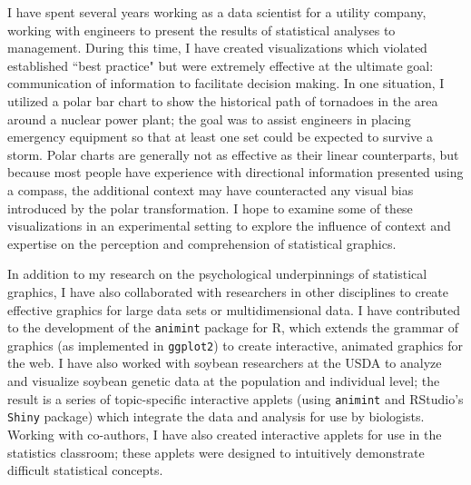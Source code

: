 \documentclass[12pt, letterpaper, sans]{moderncv}
\begin{document}

\vspace{.5cm}\hspace{8pt}I have spent several years working as a data scientist for a utility company, working with engineers to present the results of statistical analyses to management. During this time, I have created visualizations which violated established ``best practice" but were extremely effective at the ultimate goal: communication of information to facilitate decision making. In one situation, I utilized a polar bar chart to show the historical path of tornadoes in the area around a nuclear power plant; the goal was to assist engineers in placing emergency equipment so that at least one set could be expected to survive a storm. Polar charts are generally not as effective as their linear counterparts, but because most people have experience with directional information presented using a compass, the additional context may have counteracted any visual bias introduced by the polar transformation. I hope to examine some of these visualizations in an experimental setting to explore the influence of context and expertise on the perception and comprehension of statistical graphics.


\vspace{.5cm}\hspace{8pt}In addition to my research on the psychological underpinnings of statistical graphics, I have also collaborated with researchers in other disciplines to create effective graphics for large data sets or multidimensional data. I have contributed to the development of the \texttt{animint} package for R, which extends the grammar of graphics (as implemented in \texttt{ggplot2}) to create interactive, animated graphics for the web. I have also worked with soybean researchers at the USDA to analyze and visualize soybean genetic data at the population and individual level; the result is a series of topic-specific interactive applets (using \texttt{animint} and RStudio's \texttt{Shiny} package) which integrate the data and analysis for use by biologists. Working with co-authors, I have also created interactive applets for use in the statistics classroom; these applets were designed to intuitively demonstrate difficult statistical concepts.
\end{document}
